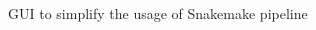 \documentclass{beamer}
\begin{document}
\begin{frame}{GUI to simplify the usage of Snakemake pipeline}
\begin{columns}
\begin{column}{0.5\textwidth}


\end{column}
\end{columns}
\end{frame}
\end{document}

